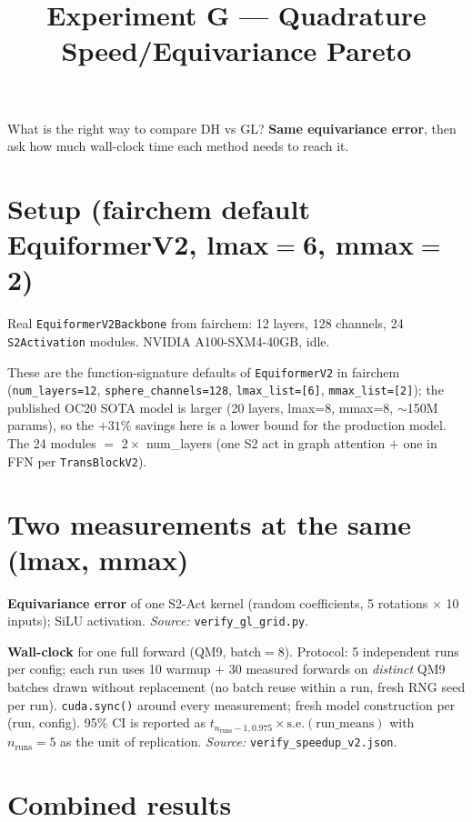 \documentclass[10pt,a4paper]{article}
\title{\vspace{-2em}\textbf{Experiment G --- Quadrature Speed/Equivariance Pareto}}
\author{}
\date{}
\begin{document}
\maketitle
\vspace{-3em}

What is the right way to compare DH vs GL? \textbf{Same equivariance error},
then ask how much wall-clock time each method needs to reach it.

\section*{Setup (fairchem default EquiformerV2, lmax$=$6, mmax$=$2)}

Real \texttt{EquiformerV2Backbone} from fairchem: 12 layers, 128 channels,
24 \texttt{S2Activation} modules. NVIDIA A100-SXM4-40GB, idle.

These are the function-signature defaults of \texttt{EquiformerV2}
in fairchem (\texttt{num\_layers=12}, \texttt{sphere\_channels=128},
\texttt{lmax\_list=[6]}, \texttt{mmax\_list=[2]}); the published OC20
SOTA model is larger (20 layers, lmax=8, mmax=8, $\sim$150M params),
so the $+31\%$ savings here is a lower bound for the production model.
The 24 modules $=$ $2 \times$ num\_layers (one S2 act in graph attention
$+$ one in FFN per \texttt{TransBlockV2}).

\section*{Two measurements at the same (lmax, mmax)}

\textbf{Equivariance error} of one S2-Act kernel (random coefficients,
5 rotations $\times$ 10 inputs); SiLU activation. \emph{Source:}
\texttt{verify\_gl\_grid.py}.

\textbf{Wall-clock} for one full forward (QM9, batch$=$8). Protocol:
5 independent runs per config; each run uses 10 warmup $+$ 30 measured
forwards on \emph{distinct} QM9 batches drawn without replacement
(no batch reuse within a run, fresh RNG seed per run).
\texttt{cuda.sync()} around every measurement; fresh model construction
per (run, config). 95\% CI is reported as
$t_{n_\text{runs}-1, 0.975} \times \mathrm{s.e.}(\text{run\_means})$
with $n_\text{runs}=5$ as the unit of replication. \emph{Source:}
\texttt{verify\_speedup\_v2.json}.

\section*{Combined results}
\end{document}
